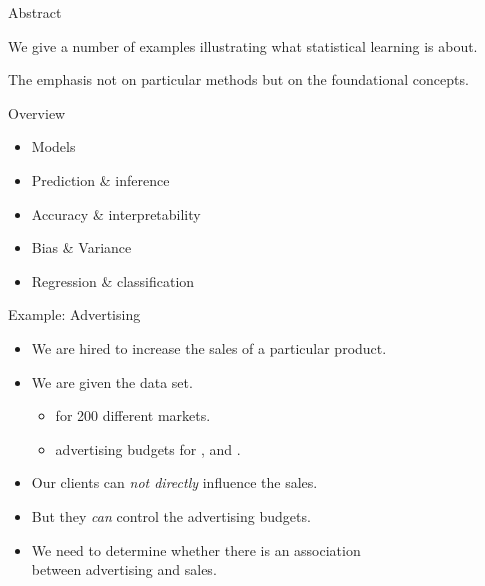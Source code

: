 \documentclass[mathserif, aspectratio=169]{beamer}
\subtitle{\bfseries%
  {Statistical Learning}\\%
  {\tiny\it what is it?, models, regression, classification, prediction, inference, accuracy }\\%
}
\begin{document}


\begin{frame}{Abstract}

	\begin{blurb}
		We give a number of examples illustrating what statistical learning
		is about.
		
		The emphasis not on particular methods but on the foundational concepts.

	\end{blurb}
\end{frame}

\begin{frame}{Overview}
	\begin{itemize}
		\item Models
		\item Prediction \& inference
		\item Accuracy  \& interpretability
		\item Bias \& Variance
		\item Regression \& classification
	\end{itemize}
\end{frame}

\begin{frame}{Example: Advertising}
	\begin{itemize}
		\item We are hired to increase the sales of a particular product.
		\item We are given the  data set.
			\begin{itemize}
				\item {} for 200 different markets.
				\item advertising budgets for ,  and .
			\end{itemize}
		\item Our clients can \emph{not directly} influence the sales.
		\item But they \emph{can} control the advertising budgets.
		\item We need to determine whether there is an association \\
			between advertising and sales. 
	\end{itemize}
\end{frame}
\end{document}
